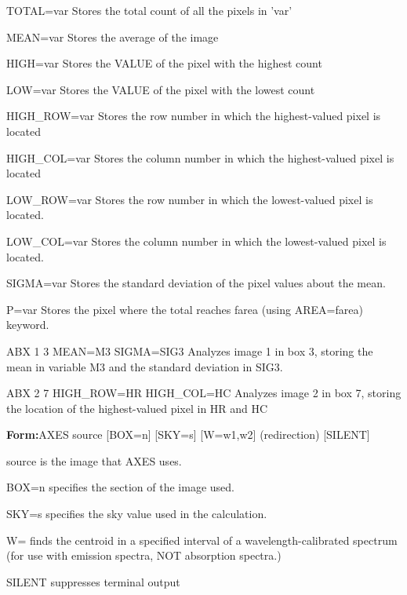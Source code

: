 {\newpage\clearpage
{}%
\begin{example}
  \item[TOTAL=var\hfill]{Stores the total count of all the pixels in 'var'}
  \item[MEAN=var\hfill]{Stores the average of the image}
  \item[HIGH=var\hfill]{Stores the VALUE of the pixel with the highest count}
  \item[LOW=var\hfill]{Stores the VALUE of the pixel with the lowest count}
  \item[HIGH\_ROW=var\hfill]{Stores the row number in which the highest-valued
       pixel is located}
  \item[HIGH\_COL=var\hfill]{Stores the column number in which the 
       highest-valued pixel is located}
  \item[LOW\_ROW=var\hfill]{Stores the row number in which the lowest-valued
       pixel is located.}
  \item[LOW\_COL=var\hfill]{Stores the column number in which the lowest-valued
       pixel is located.}
  \item[SIGMA=var\hfill]{Stores the standard deviation of the pixel values
       about the mean.}
  \item[P=var \hfill]{ Stores the pixel where the total reaches farea
       (using AREA=farea) keyword.}
\end{example}%
\lthtmlfigureZ
\lthtmlcheckvsize\clearpage}

{\newpage\clearpage
{}%
\begin{example}
  \item[ABX 1 3 MEAN=M3 SIGMA=SIG3\hfill]{Analyzes image 1 in box 3, storing
       the mean in variable M3 and the standard deviation in SIG3.}
  \item[ABX 2 7 HIGH\_ROW=HR HIGH\_COL=HC\hfill]{ Analyzes image 2 in box 7, 
       storing the location of the highest-valued pixel in HR and HC}
\end{example}%
\lthtmlfigureZ
\lthtmlcheckvsize\clearpage}

{\newpage\clearpage
{}%
\begin{command}
  \item[\textbf{Form:}AXES source {[BOX=n]} {[SKY=s]} {[W=w1,w2]} (redirection) {[SILENT]}\hfill]{}
  \item[source\hfill]{is the image that AXES uses.}
  \item[BOX=n\hfill]{specifies the section of the image used.}
  \item[SKY=s\hfill]{specifies the sky value used in the calculation.}
  \item[W=\hfill]{finds the centroid in a specified interval
of a wavelength-calibrated spectrum (for use
with emission spectra, NOT absorption spectra.)}
  \item[SILENT \hfill]{suppresses terminal output}
\end{command}%
\lthtmlfigureZ
\lthtmlcheckvsize\clearpage}

